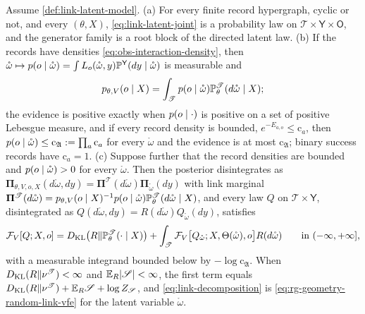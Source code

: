Assume \cref{def:link-latent-model}. (a) For every finite record hypergraph, cyclic or not, and every
$(\theta,X)$, \eqref{eq:link-latent-joint} is a probability law on $\mathscr T\times\mathsf Y\times\mathsf O$,
and the generator family is a root block of the directed latent law. (b) If the records have densities
\eqref{eq:obs-interaction-density}, then
$\mathring\omega\mapsto p(o\mid\mathring\omega)=\int L_o(\mathring\omega,y)\mathbb P^{\mathsf Y}(dy\mid\mathring\omega)$
is measurable and
\begin{equation}
p_{\theta,V}(o\mid X)=\int_{\mathscr T}p(o\mid\mathring\omega)\mathbb P^{\mathscr T}_\theta(d\mathring\omega\mid X);
\label{eq:link-latent-evidence}
\end{equation}
the evidence is positive exactly when $p(o\mid\cdot)$ is positive on a set of positive Lebesgue measure,
and if every record density is bounded, $e^{-E_{a,o}}\leq\mathrm c_a$, then
$p(o\mid\mathring\omega)\leq\mathrm c_{\mathfrak A}:=\prod_a\mathrm c_a$ for every $\mathring\omega$ and the evidence is at
most $\mathrm c_{\mathfrak A}$; binary success records have $\mathrm c_a=1$. (c) Suppose further that the record
densities are bounded and $p(o\mid\mathring\omega)>0$ for every $\mathring\omega$. Then the posterior
disintegrates as
$\boldsymbol\Pi_{\theta,V,o,X}(d\mathring\omega,dy)=\boldsymbol\Pi^{\mathscr T}(d\mathring\omega)\boldsymbol\Pi_{\mathring\omega}(dy)$
with link marginal
$\boldsymbol\Pi^{\mathscr T}(d\mathring\omega)=p_{\theta,V}(o\mid X)^{-1}p(o\mid\mathring\omega)\mathbb P^{\mathscr T}_\theta(d\mathring\omega\mid X)$,
and every law $Q$ on $\mathscr T\times\mathsf Y$, disintegrated as $Q(d\mathring\omega,dy)=R(d\mathring\omega)Q_{\mathring\omega}(dy)$,
satisfies
\begin{equation}
\mathcal F_V[Q;X,o]
=D_{\mathrm{KL}}\bigl(R\Vert\mathbb P^{\mathscr T}_\theta(\cdot\mid X)\bigr)
+\int_{\mathscr T}\mathcal F_V\bigl[Q_{\mathring\omega};X,\Theta(\mathring\omega),o\bigr]R(d\mathring\omega)
\qquad\text{in }(-\infty,+\infty],
\label{eq:link-decomposition}
\end{equation}
with a measurable integrand bounded below by $-\log\mathrm c_{\mathfrak A}$. When $D_{\mathrm{KL}}(R\Vert\nu^{\mathscr T})<\infty$
and $\mathbb E_R\lvert\mathscr S\rvert<\infty$, the first term equals
$D_{\mathrm{KL}}(R\Vert\nu^{\mathscr T})+\mathbb E_R\mathscr S+\log Z_{\mathscr S}$, and \eqref{eq:link-decomposition} is
\eqref{eq:rg-geometry-random-link-vfe} for the latent variable $\mathring\omega$. 

